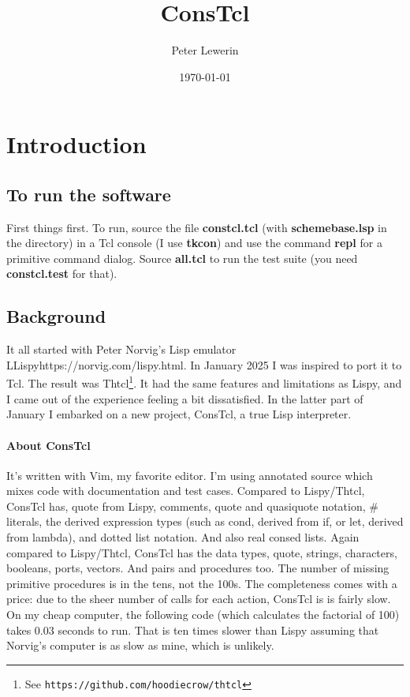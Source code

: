 \documentclass[twoside,9pt]{report}
\title{ConsTcl}
\author{Peter Lewerin}
\date{\today}
\begin{document}
\pagestyle{headings}
\maketitle
\tableofcontents

\chapter{Introduction}
\label{introduction}
\section{To run the software}
\label{to-run-the-software}


First things first. To run, source the file \textbf{constcl.tcl} (with
\textbf{schemebase.lsp} in the directory) in a Tcl console (I use
\textbf{tkcon}) and use the command \textbf{repl} for a primitive command
dialog. Source \textbf{all.tcl} to run the test suite (you need
\textbf{constcl.test} for that).

\section{Background}
\label{background}

It all started with Peter Norvig's Lisp emulator
L{Lispy}{https://norvig.com/lispy.html}. In January 2025 I was inspired to port
it to Tcl. The result was Thtcl\footnote{See
\texttt{https://github.com/hoodiecrow/thtcl}}. It had the same features and
limitations as Lispy, and I came out of the experience feeling a bit
dissatisfied. In the latter part of January I embarked on a new project,
ConsTcl, a true Lisp interpreter.

\subsubsection{About ConsTcl}
\label{about-constcl}

It's written with Vim, my favorite editor. I'm using annotated source which
mixes code with documentation and test cases. Compared to Lispy/Thtcl, ConsTcl
has, quote from Lispy, comments, quote and quasiquote notation, \# literals,
the derived expression types (such as cond, derived from if, or let, derived
from lambda), and dotted list notation. And also real consed lists. Again
compared to Lispy/Thtcl, ConsTcl has the data types, quote, strings,
characters, booleans, ports, vectors. And pairs and procedures too. The number
of missing primitive procedures is in the tens, not the 100s. The completeness
comes with a price: due to the sheer number of calls for each action, ConsTcl
is is fairly slow. On my cheap computer, the following code (which calculates
the factorial of 100) takes 0.03 seconds to run. That is ten times slower than
Lispy assuming that Norvig's computer is as slow as mine, which is unlikely.
\end{document}
